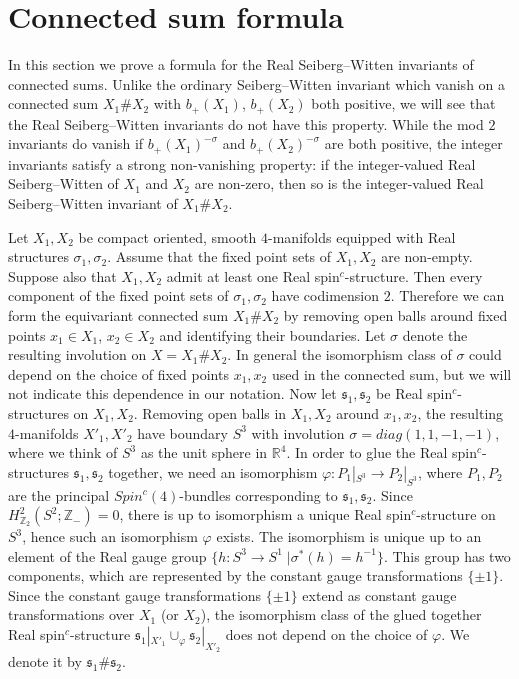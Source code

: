 \documentclass{amsart}
\theoremstyle{definition}
\theoremstyle{remark}
\numberwithin{equation}{section}
\begin{document}
\section{Connected sum formula}\label{sec:csf}

In this section we prove a formula for the Real Seiberg--Witten invariants of connected sums. Unlike the ordinary Seiberg--Witten invariant which vanish on a connected sum $X_1 \# X_2$ with $b_+(X_1)$, $b_+(X_2)$ both positive, we will see that the Real Seiberg--Witten invariants do not have this property. While the mod $2$ invariants do vanish if $b_+(X_1)^{-\sigma}$ and $b_+(X_2)^{-\sigma}$ are both positive, the integer invariants satisfy a strong non-vanishing property: if the integer-valued Real Seiberg--Witten of $X_1$ and $X_2$ are non-zero, then so is the integer-valued Real Seiberg--Witten invariant of $X_1 \# X_2$.

Let $X_1,X_2$ be compact oriented, smooth $4$-manifolds equipped with Real structures $\sigma_1,\sigma_2$. Assume that the fixed point sets of $X_1,X_2$ are non-empty. Suppose also that $X_1,X_2$ admit at least one Real spin$^c$-structure. Then every component of the fixed point sets of $\sigma_1,\sigma_2$ have codimension $2$. Therefore we can form the equivariant connected sum $X_1 \# X_2$ by removing open balls around fixed points $x_1 \in X_1$, $x_2 \in X_2$ and identifying their boundaries. Let $\sigma$ denote the resulting involution on $X = X_1 \# X_2$. In general the isomorphism class of $\sigma$ could depend on the choice of fixed points $x_1,x_2$ used in the connected sum, but we will not indicate this dependence in our notation. Now let $\mathfrak{s}_1, \mathfrak{s}_2$ be Real spin$^c$-structures on $X_1,X_2$. Removing open balls in $X_1,X_2$ around $x_1,x_2$, the resulting $4$-manifolds $X'_1,X'_2$ have boundary $S^3$ with involution $\sigma = diag(1,1,-1,-1)$, where we think of $S^3$ as the unit sphere in $\mathbb{R}^4$. In order to glue the Real spin$^c$-structures $\mathfrak{s}_1, \mathfrak{s}_2$ together, we need an isomorphism $\varphi : P_1|_{S^3} \to P_2|_{S^3}$, where $P_1,P_2$ are the principal $Spin^c(4)$-bundles corresponding to $\mathfrak{s}_1,\mathfrak{s}_2$. Since $H^2_{\mathbb{Z}_2}(S^2 ; \mathbb{Z}_-) = 0$, there is up to isomorphism a unique Real spin$^c$-structure on $S^3$, hence such an isomorphism $\varphi$ exists. The isomorphism is unique up to an element of the Real gauge group $\{ h : S^3 \to S^1 \; | \sigma^*(h) = h^{-1} \}$. This group has two components, which are represented by the constant gauge transformations $\{ \pm 1\}$. Since the constant gauge transformations $\{ \pm 1\}$ extend as constant gauge transformations over $X_1$ (or $X_2$), the isomorphism class of the glued together Real spin$^c$-structure $\mathfrak{s}_1 |_{X'_1} \cup_{\varphi} \mathfrak{s}_2 |_{X'_2}$ does not depend on the choice of $\varphi$. We denote it by $\mathfrak{s}_1 \# \mathfrak{s}_2$.
\end{document}
